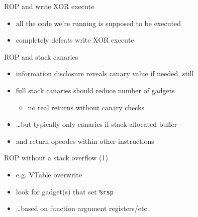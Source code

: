 \begin{frame}{ROP and write XOR execute}
    \begin{itemize}
    \item all the code we're running is supposed to be executed
    \item completely defeats write XOR execute
    \end{itemize}
\end{frame}

\begin{frame}{ROP and stack canaries}
    \begin{itemize}
    \item information disclosure reveals canary value if needed, still
    \item full stack canaries should reduce number of gadgets
        \begin{itemize}
        \item no real returns without canary checks
        \end{itemize}
    \item \ldots but typically only canaries if stack-allocated buffer
    \item and return opcodes within other instructions
    \end{itemize}
\end{frame}

\begin{frame}{ROP without a stack overflow (1)}
    \begin{itemize}
    \item e.g. VTable overwrite
    \item look for gadget(s) that set {\tt \%rsp}
    \item \ldots based on function argument registers/etc.
    \end{itemize}
\end{frame}

